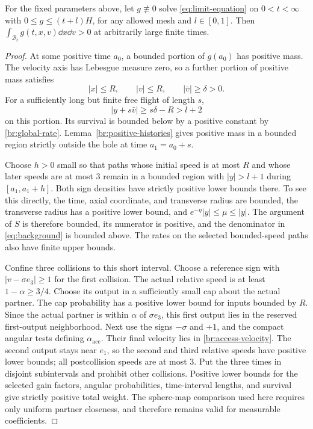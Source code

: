 \begin{lemma}\label{br:accessibility}
For the fixed parameters above, let \(g\not\equiv0\) solve
\eqref{eq:limit-equation} on \(0<t<\infty\) with
\(0\le g\le(t+l)H\), for any allowed mesh and \(l\in[0,1]\).
Then \(\int_{\mathcal B_t}g(t,x,v)\dd x\dd v>0\) at arbitrarily large
finite times.
\end{lemma}

\begin{proof}
At some positive time \(a_0\), a bounded portion of \(g(a_0)\) has
positive mass. The velocity axis has Lebesgue measure zero, so a
further portion of positive mass satisfies
\[
|x|\le R,\qquad |v|\le R,\qquad |\bar v|\ge\delta>0.
\]
For a sufficiently long but finite free flight of length \(s\),
\[
|y+s\bar v|\ge s\delta-R>l+2
\]
on this portion. Its survival is bounded below by a positive constant
by \eqref{br:global-rate}. Lemma~\ref{br:positive-histories} gives
positive mass in a bounded region strictly outside the hole at
time \(a_1=a_0+s\).

Choose \(h>0\) small so that paths whose initial speed is at most
\(R\) and whose later speeds are at most 3 remain in a bounded region
with \(|y|>l+1\) during \([a_1,a_1+h]\). Both sign densities have
strictly positive lower bounds there. To see this directly, the time,
axial coordinate, and transverse radius are bounded, the transverse
radius has a positive lower bound, and
\(e^{-\eta}|y|\le\mu\le|y|\). The argument of \(S\) is therefore
bounded, its numerator is positive, and the denominator in
\eqref{eq:background} is bounded above. The rates on the selected
bounded-speed paths also have finite upper bounds.

Confine three collisions to this short interval. Choose a reference
sign with \(|v-\sigma e_3|\ge1\) for the first collision. The actual
relative speed is at least \(1-\alpha\ge3/4\).
Choose its output in a sufficiently small cap about the actual
partner. The cap probability has a positive lower bound for inputs
bounded by \(R\). Since the actual partner is within \(\alpha\) of
\(\sigma e_3\), this first output lies in the reserved first-output
neighborhood. Next use the signs \(-\sigma\) and \(+1\), and the
compact angular tests defining \(\alpha_{\mathrm{acc}}\). Their final
velocity lies in \eqref{br:access-velocity}. The second output stays
near \(e_1\), so the second and third relative speeds have positive
lower bounds; all postcollision speeds are at most 3.
Put the three times in disjoint subintervals and prohibit other
collisions. Positive lower bounds for the selected gain factors,
angular probabilities, time-interval lengths, and survival give
strictly positive total weight. The sphere-map comparison used here
requires only uniform partner closeness, and therefore remains valid
for measurable coefficients.


\end{proof}

